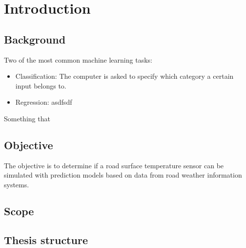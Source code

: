 \chapter{Introduction}
\section{Background}
	Two of the most common machine learning tasks: 
	\begin{itemize}
		\item{Classification:} The computer is asked to specify which category a certain input belongs to.
		\item{Regression:} asdfsdf
	\end{itemize} \cite{BOOK:1}
	Something that \cite{WEBSITE:1}

\section{Objective}
	The objective is to determine if a road surface temperature sensor can be simulated with prediction models based on data from road weather information systems.
\section{Scope}

\section{Thesis structure}
